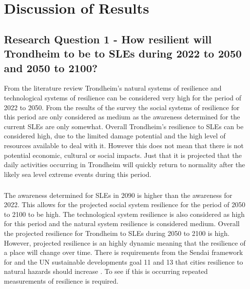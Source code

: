 





\chapter{Discussion of Results}

\section{Research Question 1 - How resilient will Trondheim to be to SLEs during 2022 to 2050 and 2050 to 2100? }
From the literature review Trondheim's natural systems of resilience and technological systems of resilience can be considered very high for the period of 2022 to 2050. From the results of the survey the  social systems of resilience for this period are only considered as medium as the awareness determined for the current SLEs are only somewhat. Overall Trondheim's resilience to SLEs can be considered high, due to the limited damage potential and the high level of resources available to deal with it. However this does not mean that there is not potential economic, cultural or social impacts. Just that it is projected that the daily activities occurring in Trondheim will quickly return to normality after the likely sea level extreme events during this period.
\paragraph{}
The awareness determined for SLEs in 2090 is higher than the awareness for 2022. This allows for the projected social system resilience for the period of 2050 to 2100 to be high. The technological system resilience is also considered as high for this period and the natural system resilience is considered medium. Overall the projected resilience for Trondheim to SLEs during 2050 to 2100 is high. However, projected resilience is an highly dynamic meaning that the resilience of a place will change over time. There is requirements from the Sendai framework for and the UN sustainable developments goal 11 and 13 that cities resilience to natural hazards should increase \cite{gonzalez-riancho_storm_2017}. To see if this is occurring repeated measurements of resilience is required. 


